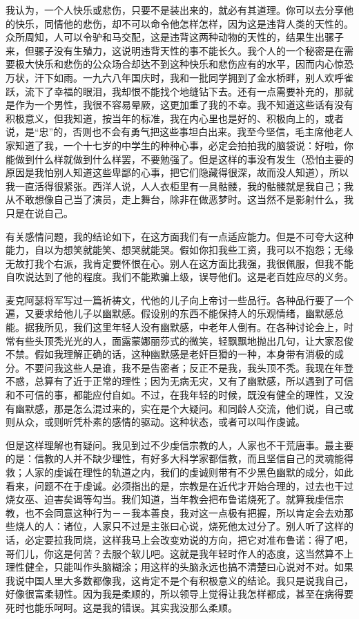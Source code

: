我认为，一个人快乐或悲伤，只要不是装出来的，就必有其道理。你可以去分享他的快乐，同情他的悲伤，却不可以命令他怎样怎样，因为这是违背人类的天性的。众所周知，人可以令驴和马交配，这是违背这两种动物的天性的，结果生出骡子来，但骡子没有生殖力，这说明违背天性的事不能长久。我个人的一个秘密是在需要极大快乐和悲伤的公众场合却达不到这种快乐和悲伤应有的水平，因而内心惊恐万状，汗下如雨。一九六八年国庆时，我和一批同学拥到了金水桥畔，别人欢呼雀跃，流下了幸福的眼泪，我却恨不能找个地缝钻下去。还有一点需要补充的，那就是作为一个男性，我很不容易晕厥，这更加重了我的不幸。我不知道这些话有没有积极意义，但我知道，按当年的标准，我在内心里也是好的、积极向上的，或者说，是“忠”的，否则也不会有勇气把这些事坦白出来。我至今坚信，毛主席他老人家知道了我，一个十七岁的中学生的种种心事，必定会拍拍我的脑袋说：好啦，你能做到什么样就做到什么样罢，不要勉强了。但是这样的事没有发生（恐怕主要的原因是我怕别人知道这些卑鄙的心事，把它们隐藏得很深，故而没人知道），所以我一直活得很紧张。西洋人说，人人衣柜里有一具骷髅，我的骷髅就是我自己；我从不敢想像自己当了演员，走上舞台，除非在做恶梦时。这当然不是影射什么，我只是在说自己。 

有关感情问题，我的结论如下，在这方面我们有一点适应能力。但是不可夸大这种能力，自以为想笑就能笑、想哭就能哭。假如你扣我些工资，我可以不抱怨；无缘无故打我个右派，我肯定要怀恨在心。别人在这方面比我强，我很佩服，但我不能自吹说达到了他的程度。我们不能欺骗上级，误导他们。这是老百姓应尽的义务。 

麦克阿瑟将军写过一篇祈祷文，代他的儿子向上帝讨一些品行。各种品行要了一个遍，又要求给他儿子以幽默感。假设别的东西不能保持人的乐观情绪，幽默感总能。据我所见，我们这里年轻人没有幽默感，中老年人倒有。在各种讨论会上，时常有些头顶秃光光的人，面露蒙娜丽莎式的微笑，轻飘飘地抛出几句，让大家忍俊不禁。假如我理解正确的话，这种幽默感是老奸巨猾的一种，本身带有消极的成分。不要问我这些人是谁，我不是告密者；反正不是我，我头顶不秃。我现在年登不惑，总算有了近于正常的理性；因为无病无灾，又有了幽默感，所以遇到了可信和不可信的事，都能应付自如。不过，在我年轻的时候，既没有健全的理性，又没有幽默感，那是怎么混过来的，实在是个大疑问。和同龄人交流，他们说，自己或则从众，或则听凭朴素的感情的驱动。这种状态，或者可以叫作虔诚。 

但是这样理解也有疑问。我见到过不少虔信宗教的人，人家也不干荒唐事。最主要的是：信教的人并不缺少理性，有好多大科学家都信教，而且坚信自己的灵魂能得救；人家的虔诚在理性的轨道之内，我们的虔诚则带有不少黑色幽默的成分，如此看来，问题不在于虔诚。必须指出的是，宗教是在近代才开始合理的，过去也干过烧女巫、迫害矣谒等勾当。我们知道，当年教会把布鲁诺烧死了。就算我虔信宗教，也不会同意这种行为－－我本善良，我对这一点极有把握，所以肯定会去劝那些烧人的人：诸位，人家只不过是主张曰心说，烧死他太过分了。别人听了这样的话，必定要拉我同烧，这样我马上会改变劝说的方向，把它对准布鲁诺：得了吧，哥们儿，你这是何苦？去服个软儿吧。这就是我年轻时作人的态度，这当然算不上理性健全，只能叫作头脑糊涂；用这样的头脑永远也搞不清楚曰心说对不对。如果我说中国人里大多数都像我，这肯定不是个有积极意义的结论。我只是说我自己，好像很富柔韧性。因为我是柔顺的，所以领导上觉得让我怎样都成，甚至在病得要死时也能乐呵呵。这是我的错误。其实我没那么柔顺。 

